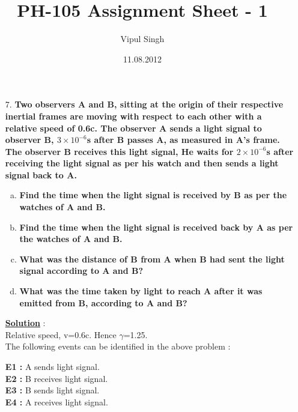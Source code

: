 \documentclass[10pt, a4paper]{article}
\begin{document}
\title{PH-105 Assignment Sheet - 1}
\date{11.08.2012}
\author{Vipul Singh}
\maketitle
\begin{enumerate}
\item[7.]{\bf Two observers A and B, sitting at the origin of their respective inertial frames are moving with respect to each other with a relative speed of 0.6c. The observer A sends a light signal to observer B, $3\times10^{-6}$s after B passes A, as measured in A's frame. The observer B receives this light signal, He waits for $2\times10^{-6}$s after receiving the light signal as per his watch and then sends a light signal back to A.}
\begin{enumerate}[(a)]
\item {\bf Find the time when the light signal is received by B as per the watches of A and B.}
\item {\bf Find the time when the light signal is received back by A as per the watches of A and B.}
\item {\bf What was the distance of B from A when B had sent the light signal according to A and B?}
\item {\bf What was the time taken by light to reach A after it was emitted from B, according to A and B?}
\end{enumerate}

{\underline {\bf Solution}} : \\
Relative speed, v=0.6c. Hence $\gamma$=1.25. \\
The following events can be identified in the above problem :
	
{\bf E1 :} A sends light signal.\\
{\bf E2 :} B receives light signal.\\
{\bf E3 :} B sends light signal.\\
{\bf E4 :} A receives light signal.
	

\end{enumerate}
\end{document}
